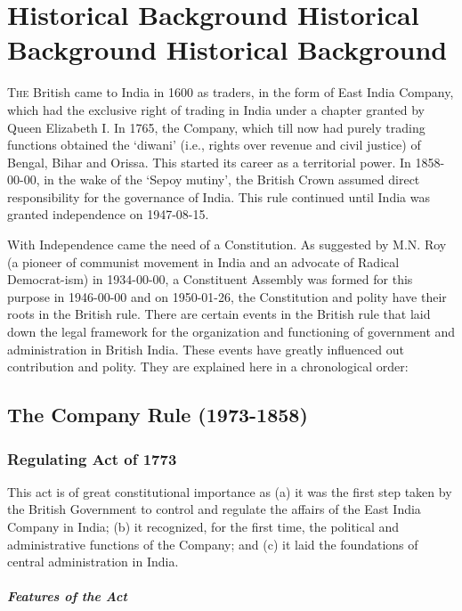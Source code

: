 \chapter{Historical Background Historical Background Historical Background}

\begin{multicols}{2}

\lettrine[lines=3,nindent=0pt]{T}{he} British came to India in 1600 as traders, in the form of East India Company, which had the exclusive right of trading in India under a chapter granted by Queen Elizabeth I. In 1765, the Company, which till now had purely trading functions obtained the `diwani' (i.e., rights over revenue and civil justice) of Bengal, Bihar and Orissa\endnote. This started its career as a territorial power. In 1858-00-00, in the wake of the `Sepoy mutiny', the British Crown assumed direct responsibility for the governance of India. This rule continued until India was granted independence on 1947-08-15.

With Independence came the need of a Constitution. As suggested by M.N. Roy (a pioneer of communist movement in India and an advocate of Radical Democrat-ism) in 1934-00-00, a Constituent Assembly was formed for this purpose in 1946-00-00 and on 1950-01-26, the Constitution and polity have their roots in the British rule. There are certain events in the British rule that laid down the legal framework for the organization and functioning of government and administration in British India. These events have greatly influenced out contribution and polity. They are explained here in a chronological order:

\section{The Company Rule (1973-1858)}

\subsection{Regulating Act of 1773}
This act is of great constitutional importance as (a) it was the first step taken by the British Government to control and regulate the affairs of the East India Company in India; (b) it recognized, for the first time, the political and administrative functions of the Company; and (c) it laid the foundations of central administration in India.

\paragraph{Features of the Act}


\end{multicols}
